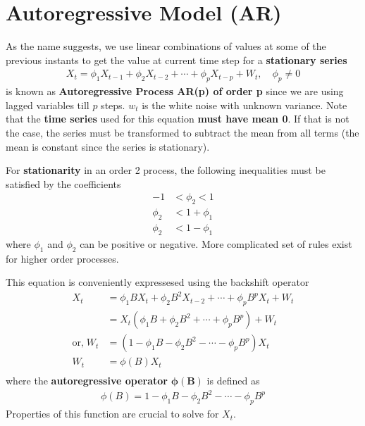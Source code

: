 \documentclass[../../time_series_notes.tex]{subfiles}
\begin{document}
\section{Autoregressive Model (AR)}
As the name suggests, we use linear combinations of values at some of the previous instants to get the value at current time step for a \textbf{stationary series}
\begin{align*}
    X_{t} = \phi_{1}X_{t-1} + \phi_{2}X_{t-2} + \cdots + \phi_{p}X_{t-p} + W_{t}, \quad \phi_{p} \neq 0
\end{align*}
is known as \textbf{Autoregressive Process AR(p) of order p} since we are using lagged variables till $p$ steps. $w_{t}$ is the white noise with unknown variance. Note that the \textbf{time series} used for this equation \textbf{must have mean 0}. If that is not the case, the series must be transformed to subtract the mean from all terms (the mean is constant since the series is stationary).\newline

For \textbf{stationarity} in an order 2 process, the following inequalities must be satisfied by the coefficients
\begin{align*}
    -1 &< \phi_{2} < 1\\
    \phi_{2} &< 1 + \phi_{1}\\
    \phi_{2} &< 1 - \phi_{1}
\end{align*}
where $\phi_{1}$ and $\phi_{2}$ can be positive or negative. More complicated set of rules exist for higher order processes.\newline

This equation is conveniently expressesed using the backshift operator
\begin{align*}
    X_{t} &= \phi_{1}BX_{t} + \phi_{2}B^{2}X_{t-2} + \cdots + \phi_{p}B^{p}X_{t} + W_{t}\\
    &= X_{t}(\phi_{1}B + \phi_{2}B^{2} + \cdots + \phi_{p}B^{p}) + W_{t}\\
    \text{or,} \; W_{t} &= (1 - \phi_{1}B - \phi_{2}B^{2} - \cdots - \phi_{p}B^{p})X_{t}\\
    W_{t} &= \phi(B)X_{t}\\
\end{align*}
where the \textbf{autoregressive operator} $\bm{\phi(B)}$ is defined as
\begin{align*}
    \phi(B) = 1 - \phi_{1}B - \phi_{2}B^{2} - \cdots - \phi_{p}B^{p}
\end{align*}
Properties of this function are crucial to solve for $X_{t}$.
\end{document}
